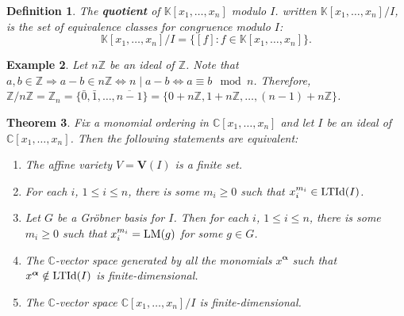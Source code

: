 \documentclass[a4paper,12pt]{article}
\newtheorem{theorem}{Theorem}[section]
\newtheorem{definition}[theorem]{Definition}
\newtheorem{example}[theorem]{Example}
\newcommand{\KK}{\mathbb{K}}
\newcommand{\CC}{\mathbb{C}}
\newcommand{\ZZ}{\mathbb{Z}}
\newcommand{\LM }{{\rm LM}}
\newcommand{\LTId }{{\rm LTId}}
\newcommand{\mi}[1]{\boldsymbol{#1}}
\newcommand{\divides}{\mid}
\newcommand{\vrty}{\textbf{V}}
\begin{document}
\begin{definition}
	The \textbf{quotient} of $\KK[x_1, \ldots, x_n]$ modulo $I$. written $\KK[x_1, \ldots, x_n]/I$, is the set of equivalence classes for congruence modulo $I$: 
	$$\KK[x_1, \ldots, x_n]/I = \{[f] : f \in \KK[x_1, \ldots, x_n]\}.$$
\end{definition}
\begin{example}
	Let $n\ZZ$ be an ideal of $\ZZ$. Note that $a,b \in \ZZ \Rightarrow a-b\in n \ZZ \Leftrightarrow n \divides a-b \Leftrightarrow a \equiv b \mod n$. Therefore, $\ZZ/n \ZZ = \ZZ_n = \{\bar 0, \bar 1, \ldots , \overline{n-1} \} = \{0 + n \ZZ, 1 + n \ZZ, \ldots, (n-1) + n \ZZ \}$.
\end{example}
\begin{theorem}\label{theo:finitedimensionalquotientrings}
	Fix a monomial ordering in $ \CC[x_1,\ldots,x_n] $ and let $ I $ be an ideal of $ \CC[x_1,\ldots,x_n]$. Then the following statements are equivalent:
	\begin{enumerate}[label=(\roman*)]
		\item The affine variety $V = \vrty(I) $ is a finite set.
		\item For each $ i $, $ 1\leq i \leq n $, there is some $ m_i\geq 0 $ such that $ x_i^{m_i}\in \LTId (I) $.
		\item Let $ G $ be a Gr\"obner basis for $ I $. Then  for each $ i $, $ 1\leq i \leq n $, there is some $ m_i\geq 0 $ such that $ x_i^{m_i}=\LM (g) $ for some $ g\in G $.
		\item The $ \CC $-vector space generated by all the monomials $ x^{\mi{\alpha}}$ such that $ x^{\mi{\alpha}} \notin \LTId (I)   $ is finite-dimensional.
		\item The $ \CC $-vector space $ \CC[x_1,\ldots,x_n]/I $ is finite-dimensional.
	\end{enumerate}
\end{theorem}
\end{document}
